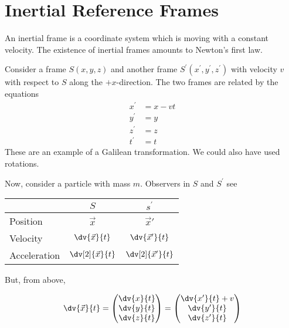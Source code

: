 
\section{Inertial Reference Frames}
\label{sec:inert-refer-fram}

An inertial frame is a coordinate system which is moving with a
constant velocity. The existence of inertial frames amounts to
Newton's first law.

Consider a frame $S(x,y,z)$ and another frame $S^\prime(x^{\prime},
y^{\prime}, z^\prime)$ with velocity $v$ with respect to $S$ along the
$+x$-direction.
The two frames are related by the equations
\begin{align}
  x^{\prime} &= x - vt \\
  y^{\prime} &= y \\
  z^\prime &= z \\
  t^{\prime} &= t
\end{align}
These are an example of a Galilean transformation. We could also have
used rotations.

Now, consider a particle with mass $m$. Observers in $S$ and
$S^{\prime}$ see

\begin{table}[H] \centering
\begin{tabular}{lcc} 
             & $S$                  & $s^{\prime}$               \\ \hline
Position     & $\vec{x}$            & $\vec{x}'$         \\ 
Velocity     & $\dv{\vec{x}}{t}$    & $\dv{\vec{x}'}{t}$ \\
Acceleration & $\dv[2]{\vec{x}}{t}$ & $\dv[2]{\vec{x}'}{t}$
\end{tabular}
\end{table}

But, from above, 

\begin{equation}%
 \dv{\vec{x}}{t} = 
 \begin{pmatrix}
   \dv{x}{t} \\ \dv{y}{t} \\ \dv{z}{t}
 \end{pmatrix}
=
\begin{pmatrix}
  \dv{x^{\prime}}{t} + v \\
 \dv{y^{\prime}}{t} \\
 \dv{z^{\prime}}{t}
\end{pmatrix}
\end{equation}


